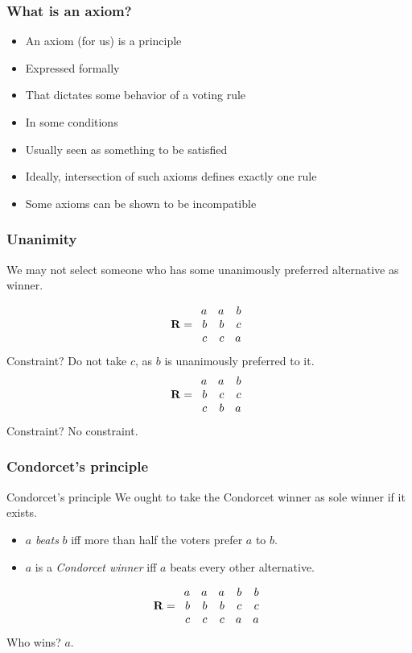 \documentclass[french,english]{beamer}
\begin{document}
\begin{frame}
	\frametitle{What is an axiom?}
	\begin{itemize}
		\item An axiom (for us) is a principle
		\item Expressed formally
		\item That dictates some behavior of a voting rule
		\item In some conditions
		\item Usually seen as something to be satisfied
		\item Ideally, intersection of such axioms defines exactly one rule
		\item Some axioms can be shown to be incompatible
	\end{itemize}
\end{frame}

\begin{frame}
	\frametitle{Unanimity}
	\begin{definition}[Unanimity]
		We may not select someone who has some unanimously preferred alternative as winner.
	\end{definition}
	\begin{equation}
		\mathbf{R} =
		\begin{array}{rrr}
			a	&	a	&	b\\
			b	&	b	&	c\\
			c	&	c	&	a
		\end{array}
	\end{equation}
	Constraint? \pause Do not take $c$, as $b$ is unanimously preferred to it.	\pause
	\begin{equation}
		\mathbf{R} =
		\begin{array}{rrr}
			a	&	a	&	b\\
			b	&	c	&	c\\
			c	&	b	&	a
		\end{array}
	\end{equation}
	Constraint? \pause No constraint.
\end{frame}

\begin{frame}
	\frametitle{Condorcet’s principle}
	\begin{block}{Condorcet’s principle}
		We ought to take the Condorcet winner as sole winner if it exists.
		\begin{itemize}
			\item $a$ \emph{beats} $b$ iff more than half the voters prefer $a$ to $b$.
			\item $a$ is a \emph{Condorcet winner} iff $a$ beats every other alternative.
		\end{itemize}
	\end{block}
	\vfill
	\begin{equation}
		\mathbf{R} =
		\begin{array}{rrrrr}
			a	&	a	&	a	&	b	&	b\\
			b	&	b	&	b	&	c	&	c\\
			c	&	c	&	c	&	a	&	a
		\end{array}
	\end{equation}
	 Who wins? \pause $a$.
\end{frame}
\end{document}
